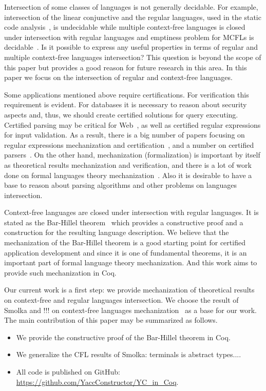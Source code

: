 Intersection of some classes of languages is not generally decidable.
For example, intersection of the linear conjunctive and the regular languages, used in the static code analysis~\cite{zhang2017context}, is undecidable while multiple context-free languages is closed under intersection with regular languages and emptiness problem for MCFLs is decidable~\cite{!!!}.
Is it possible to express any useful properties in terms of regular and multiple context-free languages intersection?
This question is beyond the scope of this paper but provides a good reason for future research in this area.
In this paper we focus on the intersection of regular and context-free languages.

Some applications mentioned above require certifications.
For verification this requirement is evident.
For databases it is necessary to reason about security aspects and, thus, we should create certified solutions for query executing.
Certified parsing may be critical for Web~\cite{!!!}, as well as certified regular expressions for input validation.
As a result, there is a big number of papers focusing on regular expressions mechanization and certification~\cite{!!!}, and a number on certified parsers~\cite{!!!}.
On the other hand, mechanization (formalization) is important by itself as theoretical results mechanization and verification, and there is a lot of work done on formal languages theory mechanization~\cite{!!!}.
Also it is desirable to have a base to reason about parsing algorithms and other problems on languages intersection.

Context-free languages are closed under intersection with regular languages.
It is stated as the Bar-Hillel theorem~\cite{bar1961formal} which provides a constructive proof and a construction for the resulting language description.
We believe that the mechanization of the Bar-Hillel theorem is a good starting point for certified application development and since it is one of fundamental theorems, it is an important part of formal language theory mechanization.
And this work aims to provide such mechanization in Coq.

Our current work is a first step: we provide mechanization of theoretical results on context-free and regular languages intersection.
We choose the result of Smolka and !!! on context-free languages mechanization~\cite{!!!} as a base for our work.
The main contribution of this paper may be summarized as follows.
\begin{itemize}
\item We provide the constructive proof of the Bar-Hillel theorem in Coq.
\item We generalize the CFL results of Smolka: terminals is abstract types....
\item All code is published on GitHub: \url{https://github.com/YaccConstructor/YC_in_Coq}.
\end{itemize}

